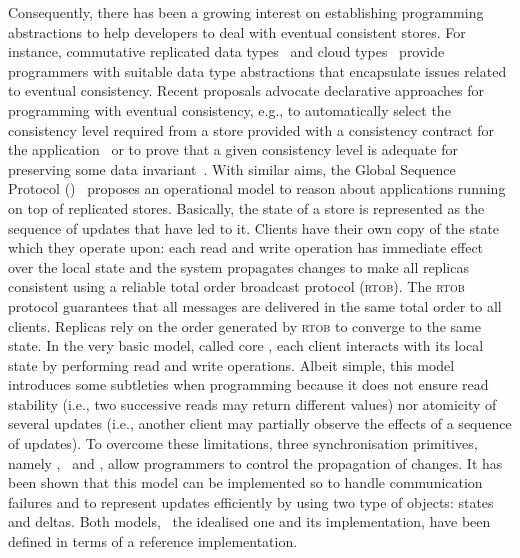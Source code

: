 Consequently,  there has been a growing interest on establishing  programming abstractions to help developers 
to deal with eventual consistent stores. For instance, commutative replicated data types~\cite{DBLP:conf/sss/ShapiroPBZ11}  and 
cloud types~\cite{burckhardt2012cloud} provide programmers with suitable data type abstractions that encapsulate issues related 
to eventual consistency. Recent proposals advocate declarative approaches for 
 programming with eventual consistency,  e.g.,  
to automatically select the consistency level required from a store provided with 
a consistency contract for the application~\cite{sivaramakrishnan2015declarative}
or to prove that  a given consistency level is adequate for preserving some data invariant~\cite{gotsman2016cause}.
With similar aims,
the Global Sequence Protocol (\gsp)~\cite{DBLP:conf/ecoop/BurckhardtLPF15} proposes  an operational model  
 to reason about applications 
running on top of replicated stores. Basically, the state of a store is represented as the sequence of updates that 
have led to it. Clients have their own copy of the state which they operate upon: each read and write operation has immediate
effect over the local state and the system propagates changes to make all replicas consistent using 
a reliable total order broadcast  protocol (\textsc{rtob}). The \textsc{rtob} protocol guarantees that all messages
are delivered  in the same total order to all clients. Replicas rely on the order generated  by \textsc{rtob} to 
converge to the same state. In the very basic model, called core \gsp, each client interacts with its local state 
  by performing read and write operations. Albeit simple, this model  introduces some subtleties when programming 
  because  it does not ensure read stability (i.e., two successive reads may 
return different values) nor atomicity of several updates (i.e., another client may partially observe the effects  
of a sequence of updates). To overcome these limitations, 
 three synchronisation primitives, namely \pullcmd, \pushcmd\ and \confcmd, 
 allow programmers to control the propagation of changes. %
It has been shown that this model can be implemented so to handle communication
failures and to represent updates efficiently by using two type of objects: states and deltas.
Both models, \ie\ the idealised one and its implementation,
have been defined in terms of a reference implementation. 

